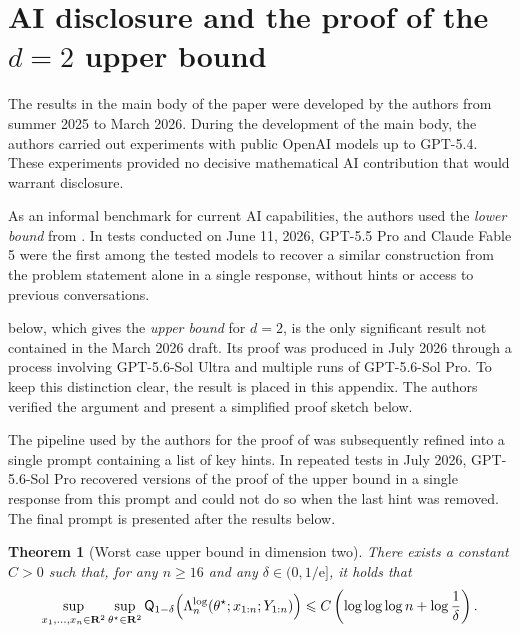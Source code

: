 \documentclass[11pt, letterpaper, hidelinks]{article}
\newcommand{\R}{\mathbf R}
\newcommand{\e}{\mathrm{e}}
\newcommand{\1}{\mathbf 1}
\renewcommand{\leq}{\leqslant}
\renewcommand{\geq}{\geqslant}
\theoremstyle{plain}
\newtheorem{theorem}{Theorem}[section]
\theoremstyle{definition}
\newcommand{\thetastar}{\theta^\star}
\newcommand{\Quant}[1]{\mathsf{Q}_{#1}}
\begin{document}
{\footnotesize


}

\appendix

\section{AI disclosure and the proof of the \(d=2\) upper bound}
\label{app:ai-disclosure-d2}

The results in the main body of the paper were developed by the authors from summer 2025 to March 2026. During the
development of the main body, the authors carried out experiments
with public OpenAI models up to GPT-5.4. These experiments provided no decisive mathematical AI contribution that would warrant disclosure.

As an informal benchmark for current AI capabilities, the authors used the \emph{lower bound} from
. In tests conducted on June 11, 2026, GPT-5.5 Pro and Claude Fable 5 were the first among the tested models to
recover a similar construction from the problem statement alone in a single
response, without hints or access to previous conversations.

 below, which gives the \emph{upper bound} for $d=2$, is the
only significant result not contained in the March 2026 draft. Its proof was produced in July 2026 through a process involving GPT-5.6-Sol Ultra and multiple runs of GPT-5.6-Sol Pro. To keep this distinction clear, the result is placed in this appendix. The
authors verified the argument and present a simplified proof sketch below. 

The pipeline used by the authors for the proof of  was
subsequently refined into a single prompt containing a list of key
hints. In repeated tests in July 2026, GPT-5.6-Sol Pro
recovered versions of the proof of the upper bound in a single response from this prompt and could not do so when the last hint was removed. The final prompt is presented after the results below.

\begin{theorem}[Worst case upper bound in dimension two]
\label{thm:d2-logloglog-upper}
There exists a constant $C>0$ such that, for any $n\geq16$ and any
$\delta\in(0,1/\e]$, it holds that
\[
\sup_{x_1,\ldots,x_n\in\R^2}
\sup_{\thetastar\in\R^2}
\Quant{1-\delta}
\Bigl(
\Lambda_n^{\operatorname{log}}
(\thetastar;x_{1:n};Y_{1:n})
\Bigr)
\leq
C\left(
\log\log\log n+\log\frac{1}{\delta}
\right).
\]
\end{theorem}
\end{document}

